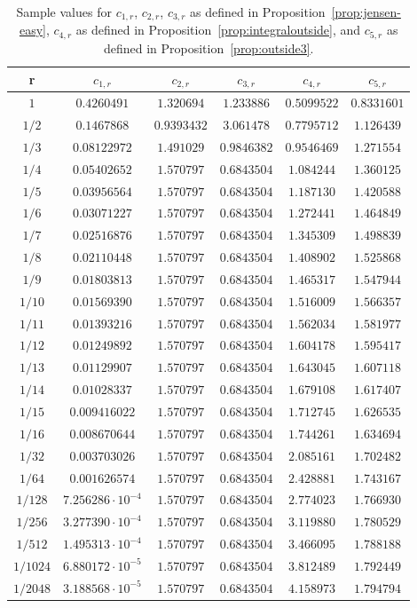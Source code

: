 \documentclass[10pt,english,letter, reqno]{amsart}
\theoremstyle{plain}
\theoremstyle{definition}
\begin{document}
\begin{table}[h]
\caption{Sample values for $c_{1,r}$, $c_{2,r}$, $c_{3,r}$ as defined in Proposition~\ref{prop:jensen-easy}, $c_{4,r}$ as defined in Proposition~\ref{prop:integraloutside}, and $c_{5,r}$ as defined in Proposition~\ref{prop:outside3}.}\label{tab:crvalues}
\begin{tabular}{|c|ccccc|}
\hline
r  & $c_{1,r}$& $c_{2,r}$& $c_{3,r}$& $c_{4,r}$& $c_{5,r}$\\
\hline
$ 1 $&$0.4260491$&$1.320694$&$1.233886$&$0.5099522$&$0.8331601$\\
$ 1/2 $&$0.1467868$&$0.9393432$&$3.061478$&$0.7795712$&$1.126439$\\
$ 1/3 $&$0.08122972$&$1.491029$&$0.9846382$&$0.9546469$&$1.271554$\\
$ 1/4 $&$0.05402652$&$1.570797$&$0.6843504$&$1.084244$&$1.360125$\\
$ 1/5 $&$0.03956564$&$1.570797$&$0.6843504$&$1.187130$&$1.420588$\\
$ 1/6 $&$0.03071227$&$1.570797$&$0.6843504$&$1.272441$&$1.464849$\\
$ 1/7 $&$0.02516876$&$1.570797$&$0.6843504$&$1.345309$&$1.498839$\\
$ 1/8 $&$0.02110448$&$1.570797$&$0.6843504$&$1.408902$&$1.525868$\\
$ 1/9 $&$0.01803813$&$1.570797$&$0.6843504$&$1.465317$&$1.547944$\\
$ 1/10 $&$0.01569390$&$1.570797$&$0.6843504$&$1.516009$&$1.566357$\\
$ 1/11 $&$0.01393216$&$1.570797$&$0.6843504$&$1.562034$&$1.581977$\\
$ 1/12 $&$0.01249892$&$1.570797$&$0.6843504$&$1.604178$&$1.595417$\\
$ 1/13 $&$0.01129907$&$1.570797$&$0.6843504$&$1.643045$&$1.607118$\\
$ 1/14 $&$0.01028337$&$1.570797$&$0.6843504$&$1.679108$&$1.617407$\\
$ 1/15 $&$0.009416022$&$1.570797$&$0.6843504$&$1.712745$&$1.626535$\\
$ 1/16 $&$0.008670644$&$1.570797$&$0.6843504$&$1.744261$&$1.634694$\\
$ 1/32 $&$0.003703026$&$1.570797$&$0.6843504$&$2.085161$&$1.702482$\\
$ 1/64 $&$0.001626574$&$1.570797$&$0.6843504$&$2.428881$&$1.743167$\\
$ 1/128 $&$7.256286\cdot 10^{-4}$&$1.570797$&$0.6843504$&$2.774023$&$1.766930$\\
$ 1/256 $&$3.277390\cdot 10^{-4}$&$1.570797$&$0.6843504$&$3.119880$&$1.780529$\\
$ 1/512 $&$1.495313\cdot 10^{-4}$&$1.570797$&$0.6843504$&$3.466095$&$1.788188$\\
$ 1/1024 $&$6.880172\cdot 10^{-5}$&$1.570797$&$0.6843504$&$3.812489$&$1.792449$\\
$ 1/2048 $&$3.188568\cdot 10^{-5}$&$1.570797$&$0.6843504$&$4.158973$&$1.794794$\\
\hline
\end{tabular}
\end{table}
\end{document}
